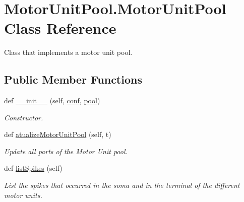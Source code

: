 \hypertarget{class_motor_unit_pool_1_1_motor_unit_pool}{}\section{Motor\+Unit\+Pool.\+Motor\+Unit\+Pool Class Reference}
\label{class_motor_unit_pool_1_1_motor_unit_pool}


Class that implements a motor unit pool.  


\subsection*{Public Member Functions}
\begin{DoxyCompactItemize}
\item 
def \hyperlink{class_motor_unit_pool_1_1_motor_unit_pool_a79dc49385a2a1c707766fd355f612088}{\+\_\+\+\_\+init\+\_\+\+\_\+} (self, \hyperlink{class_motor_unit_pool_1_1_motor_unit_pool_a3b2ee8f3e5500bfdc8fa731a5cb7d622}{conf}, \hyperlink{class_motor_unit_pool_1_1_motor_unit_pool_a832364dc014aa8a1b2947abfe063f626}{pool})
\begin{DoxyCompactList}\small\item\em Constructor. \end{DoxyCompactList}\item 
def \hyperlink{class_motor_unit_pool_1_1_motor_unit_pool_ae211c664df7b661288fe71c4a6e63a18}{atualize\+Motor\+Unit\+Pool} (self, t)
\begin{DoxyCompactList}\small\item\em Update all parts of the Motor Unit pool. \end{DoxyCompactList}\item 
def \hyperlink{class_motor_unit_pool_1_1_motor_unit_pool_a11d81004e9bf591ac9dcce582e87b4f4}{list\+Spikes} (self)
\begin{DoxyCompactList}\small\item\em List the spikes that occurred in the soma and in the terminal of the different motor units. \end{DoxyCompactList}\end{DoxyCompactItemize}
